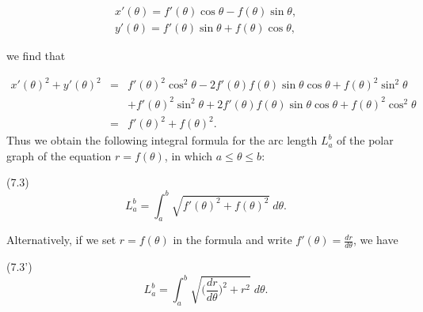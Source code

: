 \begin{eqnarray*}
x'(\theta) = f'(\theta) \cos \theta - f(\theta) \sin \theta,\\
y'(\theta) = f'(\theta) \sin \theta + f(\theta) \cos \theta, 
\end{eqnarray*}

\noindent we find that

\begin{eqnarray*}
x'(\theta)^2 + y'(\theta)^2 &=& f'(\theta)^2 \cos^2 \theta - 2f'(\theta)f(\theta) \sin \theta \cos \theta + f(\theta)^2 \sin^2 \theta\\
&&+ f'(\theta)^2 \sin^2 \theta + 2f'(\theta)f (\theta) \sin \theta \cos \theta + f(\theta)^2 \cos^2 \theta\\
&=& f'(\theta)^2 + f(\theta)^2.
\end{eqnarray*}
\noindent Thus we obtain the following integral formula for the arc length $L_a^b$ of the polar graph of the equation $r = f(\theta)$, in which $a \leq \theta \leq b$:

\begin{theorem} (7.3)
$$
L_a^b = \int_a^b \sqrt{f'(\theta)^2 + f(\theta)^2} \;d\theta.
$$
\end{theorem}

\noindent Alternatively, if we set $r = f(\theta)$ in the formula and write $f'(\theta) = \frac{dr}{d\theta}$, we have   

\begin{theorem} (7.3')
$$
L_a^b = \int_a^b \sqrt{ \Big(\frac{dr}{d\theta} \Big)^2 + r^2} \;d\theta .
$$
\end{theorem}

